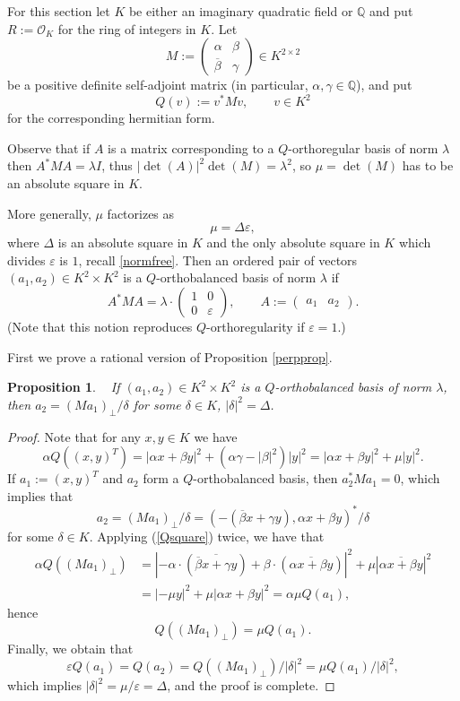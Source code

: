 \documentclass[11pt]{amsart}
\newcommand{\QQ}{\mathbb{Q}}
\newtheorem{proposition}{Proposition}[section]
\theoremstyle{definition}
\theoremstyle{remark}
\begin{document}
For this section let $K$ be either an imaginary quadratic field or $\mathbb Q$ and put $R:=\mathcal{O}_K$ for the ring of integers in $K$. Let
\[
M:=\begin{pmatrix} \alpha & \beta \\ \overline\beta & \gamma \end{pmatrix}\in K^{2\times 2}
\]
be a positive definite self-adjoint matrix (in particular, $\alpha,\gamma\in\QQ$), and put
\[
Q(v):=v^*Mv, \qquad v\in K^2
\]
for the corresponding hermitian form.


Observe that if $A$ is a matrix corresponding to a $Q$-orthoregular basis of norm $\lambda$ then $A^*MA=\lambda I$, thus $|\det(A)|^2\det(M)=\lambda^2$, so $\mu=\det(M)$ has to be an absolute square in $K$.


More generally, $\mu$ factorizes as
\[
\mu=\Delta\varepsilon,
\]
where $\Delta$ is an absolute square in $K$
and the only absolute square in $K$ which divides $\varepsilon$ is $1$, recall \eqref{normfree}.
Then an ordered pair of vectors $(a_1,a_2)\in K^2\times K^2$ is a $Q$-orthobalanced basis of norm $\lambda$ if
\[
A^*MA=\lambda\cdot\begin{pmatrix}
1 & 0 \\ 0 & \varepsilon
\end{pmatrix}, \qquad A:=\begin{pmatrix}
a_1 & a_2
\end{pmatrix}.
\]
(Note that this notion reproduces $Q$-orthoregularity if $\varepsilon=1$.)


First we prove a rational version of Proposition \ref{perpprop}.

\begin{proposition}\label{perpprop2}~
If $(a_1,a_2)\in K^2\times K^2$ is a
$Q$-orthobalanced basis of norm $\lambda$, then $a_2=(Ma_1)_\perp/\delta$ for some $\delta\in K$, $|\delta|^2=\Delta$.
\end{proposition}
\begin{proof}
Note that for any $x,y\in K$ we have
\begin{equation}\label{Qsquare}
\alpha Q((x,y)^T)=|\alpha x+\beta y|^2+(\alpha\gamma-|\beta|^2)|y|^2=|\alpha x+\beta y|^2+\mu|y|^2.
\end{equation}
If $a_1:=(x,y)^T$ and $a_2$ form a $Q$-orthobalanced basis, 
then $a_2^*Ma_1=0$, which implies that
\begin{equation}\label{Maperpcoord}
a_2
=(Ma_1)_\perp/\delta=\left(-(\overline\beta x+\gamma y), \alpha x+\beta y\right)^*/\delta
\end{equation}
for some $\delta\in K$. Applying (\ref{Qsquare}) twice, we have that
\[
\begin{split}
\alpha Q((Ma_1)_\perp)&=|-\alpha\cdot(\overline{\overline\beta x+\gamma y})+\beta\cdot(\overline{\alpha x+\beta y})|^2+\mu|\overline{\alpha x+\beta y}|^2\\
&=|-\mu y|^2+\mu|\alpha x+\beta y|^2=\alpha\mu Q(a_1),
\end{split}
\]
hence
\[
Q((Ma_1)_\perp)=\mu Q(a_1).
\]
Finally, we obtain that
\[
\varepsilon Q(a_1)=Q(a_2)=Q((Ma_1)_\perp)/|\delta|^2=\mu Q(a_1)/|\delta|^2,
\]
which implies $|\delta|^2=\mu/\varepsilon=\Delta$, and the proof is complete.
\end{proof}
\end{document}
